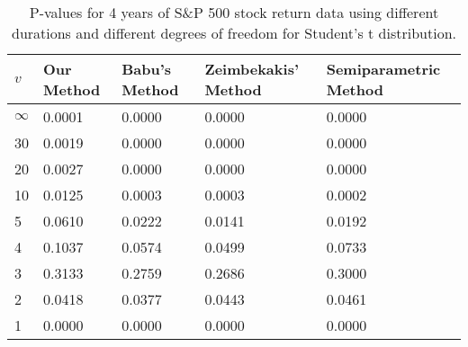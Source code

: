 \begin{table}[ht]
\centering
\caption{P-values for 4 years of S\&P 500 stock return 
                   data using different durations
  and different degrees of freedom for Student's t distribution.} 
\label{table:SP5004}
\begin{tabular}{lllll}
  \hline
$v$ & Our Method & Babu's Method & Zeimbekakis' Method & Semiparametric Method \\ 
  \hline
$\infty$ & 0.0001 & 0.0000 & 0.0000 & 0.0000 \\ 
  30 & 0.0019 & 0.0000 & 0.0000 & 0.0000 \\ 
  20 & 0.0027 & 0.0000 & 0.0000 & 0.0000 \\ 
  10 & 0.0125 & 0.0003 & 0.0003 & 0.0002 \\ 
  5 & 0.0610 & 0.0222 & 0.0141 & 0.0192 \\ 
  4 & 0.1037 & 0.0574 & 0.0499 & 0.0733 \\ 
  3 & 0.3133 & 0.2759 & 0.2686 & 0.3000 \\ 
  2 & 0.0418 & 0.0377 & 0.0443 & 0.0461 \\ 
  1 & 0.0000 & 0.0000 & 0.0000 & 0.0000 \\ 
   \hline
\end{tabular}
\end{table}

